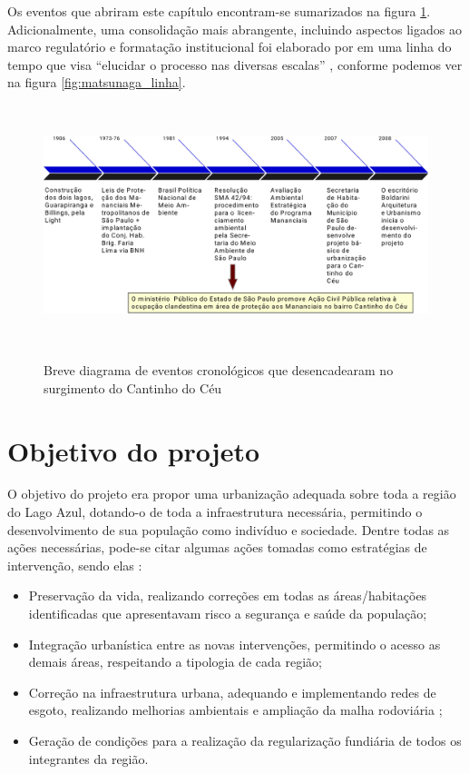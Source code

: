 	Os eventos que abriram este capítulo encontram-se sumarizados na figura \ref*{fig:cronologia}. Adicionalmente, uma consolidação mais abrangente, incluindo aspectos ligados ao marco regulatório e formatação institucional foi elaborado por  em uma linha do tempo que visa ``elucidar o processo nas diversas escalas'' \cite[p.37]{Matsunaga2015}, conforme podemos ver na figura \ref*{fig:matsunaga_linha}.
	
	\begin{figure}[htb]
		\centering
		\caption[Cronologia do surgimento do Cantinho do Céu]{Breve diagrama de eventos cronológicos que desencadearam no surgimento do Cantinho do Céu}
		\includegraphics[height=7cm]{img/cronologia}
		\label{fig:cronologia}
	\end{figure}
	
	\section{Objetivo do projeto}
	
	O objetivo do projeto era propor uma urbanização adequada sobre toda a região do Lago Azul, dotando-o de toda a infraestrutura necessária, permitindo o desenvolvimento de sua população como indivíduo e sociedade. Dentre todas as ações necessárias, pode-se citar algumas ações tomadas como estratégias de intervenção, sendo elas \cite{Archdaily2013} \cite[p.28]{Barda2012}:
	
	\begin{itemize}
	    \item Preservação da vida, realizando correções em todas as áreas/habitações identificadas que apresentavam risco a segurança e saúde da população;
	    \item Integração urbanística entre as novas intervenções, permitindo o acesso as demais áreas, respeitando a tipologia de cada região;
	    \item Correção na infraestrutura urbana, adequando e implementando redes de esgoto, realizando melhorias ambientais e ampliação da malha rodoviária ;
	    \item Geração de condições para a realização da regularização fundiária de todos os integrantes da região.
	\end{itemize}
	
